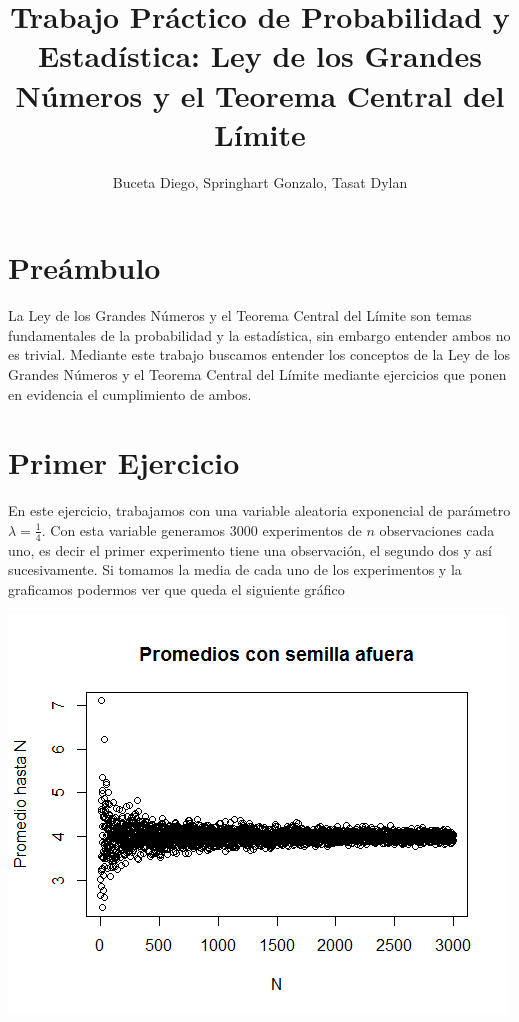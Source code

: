 \documentclass{article}
\title{{\Huge Trabajo Pr\'actico de Probabilidad y Estad\'istica:
	\linebreak 
	Ley de los Grandes N\'umeros y el Teorema Central del L\'imite}}
\author{Buceta Diego, Springhart Gonzalo, Tasat Dylan}
\begin{document}
	\maketitle %
	\thispagestyle{empty} %
	
	\newpage %
	\setcounter{page}{1} %
	
	
	\section{Pre\'ambulo}
	La Ley de los Grandes N\'umeros y el Teorema Central del L\'imite son temas fundamentales de la probabilidad y la estad\'istica, sin embargo entender ambos no es trivial. Mediante este trabajo buscamos entender los conceptos de la Ley de los Grandes N\'umeros y el Teorema Central del L\'imite mediante ejercicios que ponen en evidencia el cumplimiento de ambos.
	
	\newpage
	
	\section{Primer Ejercicio}
	En este ejercicio, trabajamos con una variable aleatoria exponencial de par\'ametro $\lambda = \frac{1}{4}$. Con esta variable generamos 3000 experimentos de $n$ observaciones cada uno, es decir el primer experimento tiene una observaci\'on, el segundo dos y as\'i sucesivamente. 
	\linebreak
Si tomamos la media de cada uno de los experimentos y la graficamos podermos ver que queda el siguiente gr\'afico

	

	{\includegraphics[scale=0.75]{grafico1}
	\centering}
	
\end{document}
